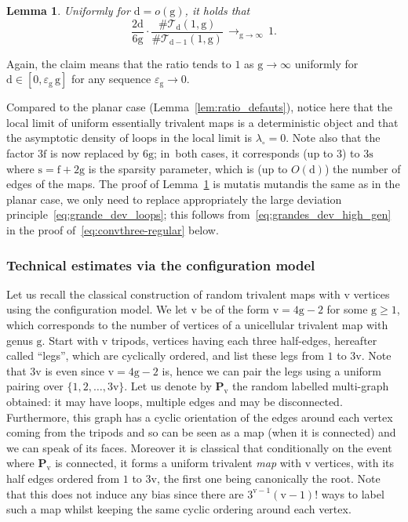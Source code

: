 \documentclass[JEP,XML,SOM,Unicode,NoFloatCountersInSection,NoEqCountersInSection]{cedram}
\theoremstyle{plain}
\newtheorem{lemma}[theorem]{Lemma}
\theoremstyle{definition}
\theoremstyle{remark}
\newcommand{\face}{\mathrm{f}}
\newcommand{\defect}{\mathrm{d}}
\newcommand{\gen}{\mathrm{g}}
\newcommand{\ver}{\mathrm{v}}
\newcommand{\spar}{\mathrm{s}}
\newcommand{\cv}[1][n]{\,\mathop{\longrightarrow}^{}_{#1 \to \infty}\,}
\begin{document}
\begin{lemma}\label{lem:ratio_defauts_genus}
Uniformly for $\defect = o(\gen)$, it holds that
\[
\frac{2 \defect}{6 \gen} \cdot \frac{\#\mathcal{T}_{\defect}(1,\gen)}{\#\mathcal{T}_{\defect-1}(1,\gen)} \cv[\gen] 1.
\]
\end{lemma}

Again, the claim means that the ratio tends to $1$ as $\gen \to \infty$ uniformly for $\defect \in [0, \varepsilon_\gen\, \gen ]$ for any sequence $\varepsilon_\gen \to 0$.

Compared to the planar case (Lemma~\ref{lem:ratio_defauts}), notice here that the local limit of uniform essentially trivalent maps is a deterministic object and that the asymptotic density of loops in the local limit is $\lambda_\circ = 0$. Note also that the factor $3\face$ is now replaced by $6\gen$; in~both cases, it corresponds (up to $3$) to $3\spar$ where $\spar=\face+2\gen$ is the sparsity parameter, which is (up to $O(\defect)$) the number of edges of the maps.
The proof of Lemma~\ref{lem:ratio_defauts_genus} is mutatis mutandis the same as in the planar case, we only need to replace appropriately the large deviation principle~\eqref{eq:grande_dev_loops}; this follows from~\eqref{eq:grandes_dev_high_gen} in the proof of~\eqref{eq:convthree-regular} below.

\subsubsection{Technical estimates via the configuration model}

Let us recall the classical construction of random trivalent maps with $ \ver$ vertices using the configuration model. We let $ \ver$ be of the form $ \ver = 4 \gen -2$ for some $\gen \geq 1$, which corresponds to the number of vertices of a unicellular trivalent map with genus $\gen$.
Start with $ \ver$ tripods, \ie vertices having each three half-edges, hereafter called ``legs'', which are cyclically ordered, and list these legs from $1$ to $3\ver$. Note that $3 \ver$ is even since $ \ver = 4 \gen-2$ is, hence we can pair the legs using a uniform pairing over $\{1,2, \dots, 3 \ver\}$. Let us denote by $\mathbf{P}_{\ver}$ the random labelled multi-graph obtained: it may have loops, multiple edges and may be disconnected. Furthermore, this graph has a cyclic orientation of the edges around each vertex coming from the tripods and so can be seen as a map (when it is connected) and we can speak of its faces. Moreover it is classical that conditionally on the event where $\mathbf{P}_{\ver}$ is connected, it forms a uniform trivalent \emph{map} with $\ver$ vertices, with its half edges ordered from $1$ to $3\ver$, the first one being canonically the root. Note that this does not induce any bias since there are $3^{\ver-1} (\ver-1)!$ ways to label such a map whilst keeping the same cyclic ordering around each vertex.
\end{document}
